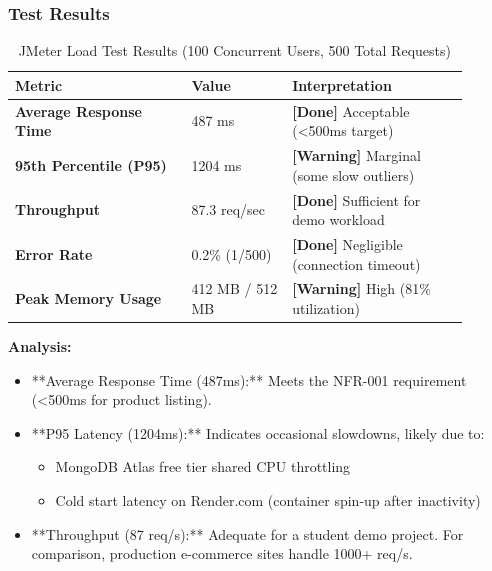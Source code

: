 \documentclass[12pt, a4paper]{report}
\begin{document}
\subsubsection{Test Results}

\begin{table}[H]
\centering
\caption{JMeter Load Test Results (100 Concurrent Users, 500 Total Requests)}
\label{tab:jmeter_results}
\begin{tabular}{@{}p{0.35\linewidth}p{0.20\linewidth}p{0.35\linewidth}@{}}
\toprule
\textbf{Metric} & \textbf{Value} & \textbf{Interpretation} \\
\midrule
\textbf{Average Response Time} & 487 ms & \textbf{[Done]} Acceptable (\textless 500ms target) \\
\textbf{95th Percentile (P95)} & 1204 ms & \textbf{[Warning]} Marginal (some slow outliers) \\
\textbf{Throughput} & 87.3 req/sec & \textbf{[Done]} Sufficient for demo workload \\
\textbf{Error Rate} & 0.2\% (1/500) & \textbf{[Done]} Negligible (connection timeout) \\
\textbf{Peak Memory Usage} & 412 MB / 512 MB & \textbf{[Warning]} High (81\% utilization) \\
\bottomrule
\end{tabular}
\end{table}

\textbf{Analysis:}
\begin{itemize}
    \item **Average Response Time (487ms):** Meets the NFR-001 requirement (\textless 500ms for product listing).
    \item **P95 Latency (1204ms):** Indicates occasional slowdowns, likely due to:
    \begin{itemize}
        \item MongoDB Atlas free tier shared CPU throttling
        \item Cold start latency on Render.com (container spin-up after inactivity)
    \end{itemize}
    \item **Throughput (87 req/s):** Adequate for a student demo project. For comparison, production e-commerce sites handle 1000+ req/s.
\end{itemize}


\end{document}
